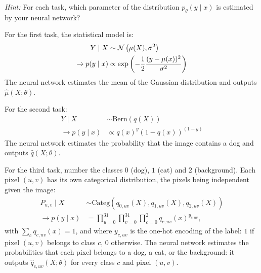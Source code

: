 \documentclass[11pt, a4paper]{exam}
\begin{document}
\begin{exercises}
\begin{parts}
    \textit{Hint:} For each task, which parameter of the distribution $p_\theta (y \mid x)$ is estimated by your neural network?

    \begin{solution}
        For the first task, the statistical model is:
        \begin{align*}
            Y \mid X &\sim \mathcal{N}\left(\mu (X), \sigma^2 \right) \\
            \rightarrow p(y \mid x) &\propto \exp\left(-\frac{1}{2}\frac{(y - \mu(x))^2}{\sigma^2} \right)
        \end{align*}
        The neural network estimates the mean of the Gaussian distribution and outputs $\hat{\mu}(X;\theta)$.

        For the second task:
        \begin{align*}
            Y \mid X &\sim \text{Bern}\left(q (X)\right) \\
            \rightarrow p(y \mid x) &\propto q(x)^{y}(1-q(x))^{(1-y)}
        \end{align*}
        The neural network estimates the probability that the image contains a dog and outputs $\hat{q}(X;\theta)$.

        For the third task, number the classes $0$ (dog), $1$ (cat) and $2$ (background). Each pixel $(u, v)$ has its own categorical distribution, the pixels being independent given the image:
        \begin{align*}
            P_{u,v} \mid X &\sim \text{Categ}\left(q_{0,uv}(X), q_{1,uv}(X), q_{2,uv}(X)\right) \\
            \rightarrow p(y \mid x) &= \prod_{u=0}^{31} \prod_{v=0}^{31} \prod_{c=0}^{2} q_{c,uv}(x)^{y_{c,uv}},
        \end{align*}
        with $\sum_c q_{c,uv}(x) = 1$, and where $y_{c,uv}$ is the one-hot encoding of the label: $1$ if pixel $(u, v)$ belongs to class $c$, $0$ otherwise. The neural network estimates the probabilities that each pixel belongs to a dog, a cat, or the background: it outputs $\hat{q}_{c,uv}(X;\theta)$ for every class $c$ and pixel $(u, v)$.


\end{solution}
\end{parts}
\end{exercises}
\end{document}
